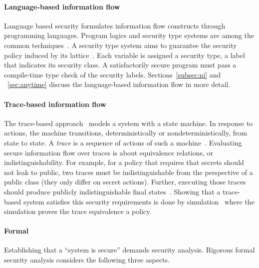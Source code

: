 \paragraph*{Language-based information flow}
Language based security formulates information flow constructs through programming languages.
Program logics and security type systems are among the common techniques~\cite{frumin2021}.
A security type system aims to guarantee the {security policy} induced by its {lattice}~\cite{marion2011}.
Each variable is assigned a {{security type}}, \ie a label that indicates its {security class}.
A satisfactorily secure program must pass a compile-time type check of the security labels.
Sections~\ref{subsec:ni} and ~\ref{sec:anytime} discuss the {language-based} information flow in more detail.

\paragraph*{Trace-based information flow}
The trace-based approach~\cite[p. 24]{eggert2014} models a system with a state machine.
In response to actions, the machine transitions, deterministically or nondeterministically, from state to state.
A \emph{trace} is a sequence of actions of such a machine~\cite{nelson2020}.
Evaluating secure information flow over traces is about equivalence relations, 
or {indistinguishability}.
For example, for a policy that requires that secrets should not leak to public, 
two traces must be indistinguishable from the perspective of a public class (they only differ on secret actions).
Further, executing those traces should produce publicly indistinguishable final states~\cite{nelson2020}.
Showing that a trace-based system satisfies this security requirements is done by {simulation}~\cite{piessens2024} 
where the simulation proves the trace equivalence \wrt a policy.

\paragraph*{Formal }
Establishing that a \enquote{system is secure} demands security analysis.
Rigorous formal security analysis considers the following three aspects.

